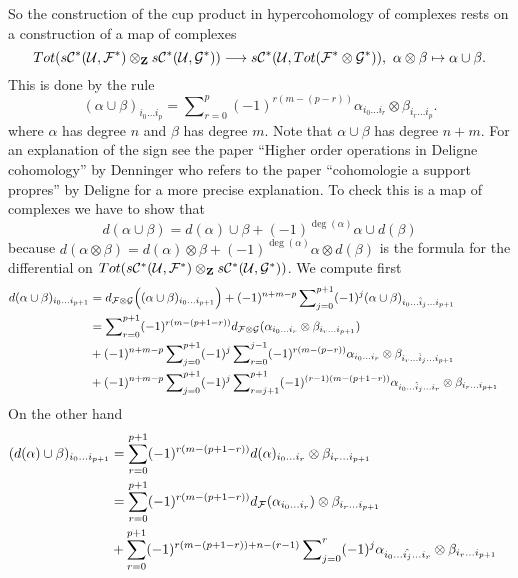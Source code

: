 \medskip\noindent
So the construction of the cup product in hypercohomology
of complexes rests on a construction of a map of complexes
$$
Tot(s{\mathcal C}^*({\mathcal U}, {\mathcal F}^*)
\otimes_{\bf Z}
s{\mathcal C}^*({\mathcal U}, {\mathcal G}^*))
\longrightarrow
s{\mathcal C}^*({\mathcal U}, Tot({\mathcal F}^*\otimes {\mathcal G}^*)), \ 
\alpha \otimes \beta \mapsto \alpha \cup \beta.
$$
This is done by the rule
$$
(\alpha \cup \beta)_{i_0\ldots i_p}
=
\sum\nolimits_{r = 0}^p
(-1)^{r(m-(p-r))}
\alpha_{i_0\ldots i_r} \otimes \beta_{i_r\ldots i_p}.
$$
where $\alpha$ has degree $n$ and $\beta$ has degree $m$.
Note that $\alpha \cup \beta$ has degree $n + m$.
For an explanation of the sign see the paper
``Higher order operations in Deligne cohomology'' by Denninger
who refers to the paper ``cohomologie a support propres'' by Deligne
for a more precise explanation.
To check this is a map of complexes we have to show that
$$
d(\alpha \cup \beta) =
d(\alpha) \cup \beta +
(-1)^{\deg(\alpha)} \alpha \cup d(\beta)
$$
because $d(\alpha \otimes \beta) = d(\alpha)\otimes\beta
+ (-1)^{\deg(\alpha)} \alpha\otimes d(\beta)$ is the formula
for the differential on $Tot(s{\mathcal C}^*({\mathcal U}, {\mathcal F}^*)
\otimes_{\bf Z} s{\mathcal C}^*({\mathcal U}, {\mathcal G}^*))$. We compute
first
\begin{align*}
d(\alpha \cup \beta)_{i_0\ldots i_{p + 1}}
& =
d_{{\mathcal F}\otimes {\mathcal G}}
\Big(
(\alpha \cup \beta)_{i_0\ldots i_{p + 1}}
\Big)
+
(-1)^{n + m-p}
\sum\nolimits_{j = 0}^{p + 1}
(-1)^j
(\alpha \cup \beta)_{i_0\ldots\hat i_j\ldots i_{p + 1}}
\cr
& =
\sum\nolimits_{r = 0}^{p + 1}
(-1)^{r(m-(p + 1-r))}
d_{{\mathcal F}\otimes {\mathcal G}}
(
\alpha_{i_0\ldots i_r} \otimes \beta_{i_r\ldots i_{p + 1}}
)
\cr
& +
(-1)^{n + m-p}
\sum\nolimits_{j = 0}^{p + 1}
(-1)^j
\sum\nolimits_{r = 0}^{j-1}
(-1)^{r(m-(p-r))}
\alpha_{i_0\ldots i_r} \otimes \beta_{i_r\ldots\hat i_j\ldots i_{p + 1}}
\cr
& +
(-1)^{n + m-p}
\sum\nolimits_{j = 0}^{p + 1}
(-1)^j
\sum\nolimits_{r = j + 1}^{p + 1}
(-1)^{(r-1)(m-(p + 1-r))}
\alpha_{i_0\ldots\hat i_j\ldots i_r} \otimes \beta_{i_r\ldots i_{p + 1}}
\end{align*}
On the other hand
\begin{align*}
(d(\alpha) \cup \beta)_{i_0\ldots i_{p + 1}}
& =
\sum_{r = 0}^{p + 1}
(-1)^{r(m-(p + 1-r))}
d(\alpha)_{i_0\ldots i_r} \otimes \beta_{i_r\ldots i_{p + 1}}
\cr
& =
\sum_{r = 0}^{p + 1}
(-1)^{r(m-(p + 1-r))}
d_{\mathcal F}(\alpha_{i_0\ldots i_r}) \otimes \beta_{i_r\ldots i_{p + 1}}
\cr
& +
\sum_{r = 0}^{p + 1}
(-1)^{r(m-(p + 1-r))+n-(r-1)}
\sum\nolimits_{j = 0}^{r}
(-1)^j
\alpha_{i_0\ldots\hat{i_j}\ldots i_r} \otimes \beta_{i_r\ldots i_{p + 1}}
\end{align*}
